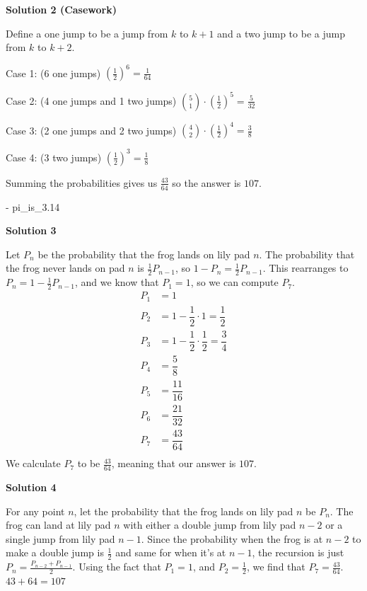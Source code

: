 \begin{enumerate}
 



\textbf{Solution 2 (Casework)}

Define a one jump to be a jump from $k$ to $k + 1$ and a two jump to be a jump from $k$ to $k + 2$. 

 Case 1: (6 one jumps) $\left (\frac{1}{2} \right)^6 = \frac{1}{64}$

 Case 2: (4 one jumps and 1 two jumps) $\binom{5}{1} \cdot \left(\frac{1}{2}\right)^5 = \frac{5}{32}$

 Case 3: (2 one jumps and 2 two jumps) $\binom{4}{2} \cdot \left(\frac{1}{2}\right)^4 = \frac{3}{8}$

 Case 4: (3 two jumps) $\left(\frac{1}{2}\right)^3 = \frac{1}{8}$

 Summing the probabilities gives us $\frac{43}{64}$ so the answer is $\boxed{107}$. 

 - pi\_is\_3.14

 



\textbf{Solution 3}

Let $P_n$ be the probability that the frog lands on lily pad $n$. The probability that the frog never lands on pad $n$ is $\frac{1}{2}P_{n-1}$, so $1-P_n=\frac{1}{2}P_{n-1}$. This rearranges to $P_n=1-\frac{1}{2}P_{n-1}$, and we know that $P_1=1$, so we can compute $P_7$.
 \begin{align*} P_1&=1\\ P_2&=1-\dfrac{1}{2} \cdot 1=\dfrac{1}{2}\\ P_3&=1-\dfrac{1}{2} \cdot \dfrac{1}{2}=\dfrac{3}{4}\\ P_4&=\dfrac{5}{8}\\ P_5&=\dfrac{11}{16}\\ P_6&=\dfrac{21}{32}\\ P_7&=\dfrac{43}{64}\\ \end{align*}
We calculate $P_7$ to be $\frac{43}{64}$, meaning that our answer is $\boxed{107}$.

 



\textbf{Solution 4}

For any point $n$, let the probability that the frog lands on lily pad $n$ be $P_n$. The frog can land at lily pad $n$ with either a double jump from lily pad $n-2$ or a single jump from lily pad $n-1$. Since the probability when the frog is at $n-2$ to make a double jump is $\frac{1}{2}$ and same for when it's at $n-1$, the recursion is just $P_n = \frac{P_{n-2}+P_{n-1}}{2}$. Using the fact that $P_1 = 1$, and $P_2 = \frac{1}{2}$, we find that $P_7 = \frac{43}{64}$. $43 + 64 = \boxed{107}$


\end{enumerate}

